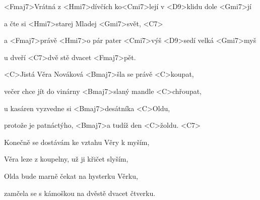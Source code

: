 

\zr
<Fmaj7>Vrátná z <Hmi7>dívčích ko<Cmi7>lejí v <D9>klidu 
dole <Gmi7>jí

a čte si <Hmi7>starej Mladej <Gmi7>svět, <C7>

a <Fmaj7>právě <Hmi7>o pár pater <Cmi7>výš <D9>sedí velká <Gmi7>myš

u dveří <C7>dvě stě dvacet <Fmaj7>pět.
\kr

\zs
<C>Jistá Věra Nováková <Bmaj7>šla se právě <C>koupat,

večer chce jít do vinárny <Bmaj7>slaný mandle <C>chřoupat,

u kasáren vyzvedne si <Bmaj7>desátníka <C>Oldu,

protože je patnáctýho, <Bmaj7>a tudíž den <C>žoldu. <C7>
\ks

\zr \kr

\zs
Konečně se dostávám ke vztahu Věry k myším,

Věra leze z koupelny, už ji křičet slyším,

Olda bude marně čekat na hysterku Věrku,

zamčela se s kámoškou na dvěstě dvacet čtverku.
\ks

\zr \kr

\kp
